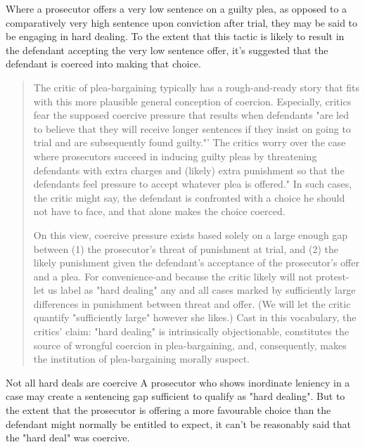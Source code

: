 Where a prosecutor offers a very low sentence on a guilty plea, as opposed to a comparatively very high sentence upon conviction after trial, they may be said to be engaging in hard dealing. To the extent that this tactic is likely to result in the defendant accepting the very low sentence offer, it's suggested that the defendant is coerced into making that choice.

\begin{quote}
    The critic of plea-bargaining typically has a rough-and-ready story that fits with this more plausible general conception of coercion. Especially, critics fear the supposed coercive pressure that results when defendants "are led to believe that they will receive longer sentences if they insist on going to trial and are subsequently found guilty."' The critics worry over the case where prosecutors succeed in inducing guilty pleas by threatening defendants with extra charges and (likely) extra punishment so that the defendants feel pressure to accept whatever plea is offered." In such cases, the critic might say, the defendant is confronted with a choice he should not have to face, and that alone makes the choice coerced.
    
    On this view, coercive pressure exists based solely on a large enough gap between (1) the prosecutor's threat of punishment at trial, and (2) the likely punishment given the defendant's acceptance of the prosecutor's offer and a plea. For convenience-and because the critic likely will not protest-let us label as "hard dealing" any and all cases marked by sufficiently large differences in punishment between threat and offer. (We will let the critic quantify "sufficiently large" however she likes.) Cast in this vocabulary, the critics' claim: "hard dealing" is intrinsically objectionable, constitutes the source of wrongful coercion in plea-bargaining, and, consequently, makes the institution of plea-bargaining morally suspect.
\end{quote}

Not all hard deals are coercive
A prosecutor who shows inordinate leniency in a case may create a sentencing gap sufficient to qualify as "hard dealing". But to the extent that the prosecutor is offering a more favourable choice than the defendant might normally be entitled to expect, it can't be reasonably said that the "hard deal" was coercive.

